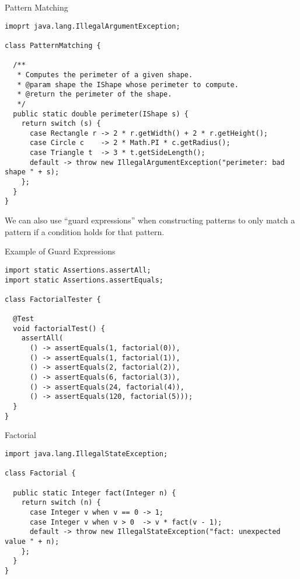 \begin{cl}[]{Pattern Matching}
\begin{lstlisting}[language=MyJava]
imoprt java.lang.IllegalArgumentException;

class PatternMatching {

  /**
   * Computes the perimeter of a given shape.
   * @param shape the IShape whose perimeter to compute.
   * @return the perimeter of the shape.
   */
  public static double perimeter(IShape s) {
    return switch (s) {
      case Rectangle r -> 2 * r.getWidth() + 2 * r.getHeight();
      case Circle c    -> 2 * Math.PI * c.getRadius();
      case Triangle t  -> 3 * t.getSideLength();
      default -> throw new IllegalArgumentException("perimeter: bad shape " + s);
    };
  }
}
\end{lstlisting}
\end{cl}

We can also use ``guard expressions'' when constructing patterns to only match a pattern if a condition holds for that pattern.


\begin{cl}[]{Example of Guard Expressions} 
\begin{lstlisting}[language=MyJava]
import static Assertions.assertAll;
import static Assertions.assertEquals;

class FactorialTester {

  @Test
  void factorialTest() {
    assertAll(
      () -> assertEquals(1, factorial(0)),
      () -> assertEquals(1, factorial(1)),
      () -> assertEquals(2, factorial(2)),
      () -> assertEquals(6, factorial(3)),
      () -> assertEquals(24, factorial(4)),
      () -> assertEquals(120, factorial(5)));
  }
}
\end{lstlisting}
\end{cl}

\begin{cl}[]{Factorial}
\begin{lstlisting}[language=MyJava]
import java.lang.IllegalStateException;

class Factorial {

  public static Integer fact(Integer n) {
    return switch (n) {
      case Integer v when v == 0 -> 1;
      case Integer v when v > 0  -> v * fact(v - 1);
      default -> throw new IllegalStateException("fact: unexpected value " + n);
    };
  }
}
\end{lstlisting}
\end{cl}

